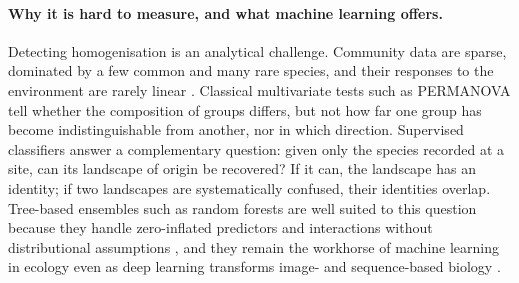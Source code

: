 \documentclass[10pt,a4paper,twocolumn]{article}
\begin{document}
\paragraph{Why it is hard to measure, and what machine learning offers.}
Detecting homogenisation is an analytical challenge. Community data are sparse, dominated by a few
common and many rare species, and their responses to the environment are rarely linear
\citep{cutler2007,legendre2012}. Classical multivariate tests such as PERMANOVA \citep{anderson2001}
tell whether the composition of groups differs, but not how far one group has become
indistinguishable from another, nor in which direction. Supervised classifiers answer a
complementary question: given only the species recorded at a site, can its landscape of origin be
recovered? If it can, the landscape has an identity; if two landscapes are systematically confused,
their identities overlap. Tree-based ensembles such as random forests \citep{breiman2001} are well
suited to this question because they handle zero-inflated predictors and interactions without
distributional assumptions \citep{cutler2007,evans2011}, and they remain the workhorse of machine
learning in ecology even as deep learning transforms image- and sequence-based biology
\citep{pichler2023,tuia2022,wang2023,jumper2021,hoye2021}.
\end{document}
